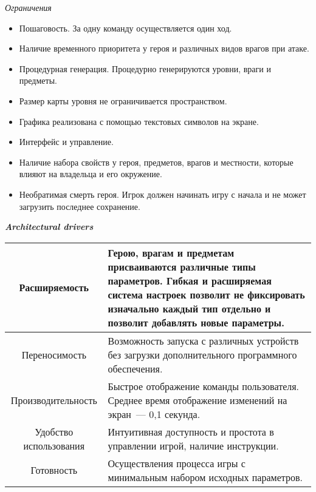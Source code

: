 \documentclass[12pt]{article}
\begin{document}
\begin{center}
\vspace*{0.1cm}
{\large \textit{Ограничения}}
\end{center}

\begin{itemize}
\item Пошаговость. За одну команду осуществляется один ход.
\item Наличие временного приоритета у героя и различных видов врагов при атаке.
\item Процедурная генерация. Процедурно генерируются уровни, враги и предметы.
\item Размер карты уровня не ограничивается пространством.
\item Графика реализована с помощью текстовых символов на экране.
\item Интерфейс и управление. 
\item Наличие набора свойств у героя, предметов, врагов и местности, которые влияют на владельца и его окружение.
\item Необратимая смерть героя. Игрок должен начинать игру с начала и не может загрузить последнее сохранение.
\end{itemize}

\begin{center}
\vspace*{0.1cm}
{\Large \textit{\textbf{Architectural drivers}}}
\end{center}

\begin{center}
\begin{tabular}{| c |p{10cm}|}
\hline
Расширяемость & Герою, врагам и предметам присваиваются различные типы параметров. Гибкая и расширяемая система настроек позволит не фиксировать изначально каждый тип отдельно и позволит добавлять новые параметры.\\
\hline
Переносимость & Возможность запуска с различных устройств без загрузки дополнительного программного обеспечения.\\
\hline
Производительность & Быстрое отображение команды пользователя. Среднее время отображение изменений на экран~--- 0,1 секунда.\\
\hline
Удобство использования & Интуитивная доступность и простота в управлении игрой, наличие инструкции.\\
\hline
Готовность & Осуществления процесса игры с минимальным набором исходных параметров.\\
\hline
\end{tabular}
\end{center}
\end{document}
